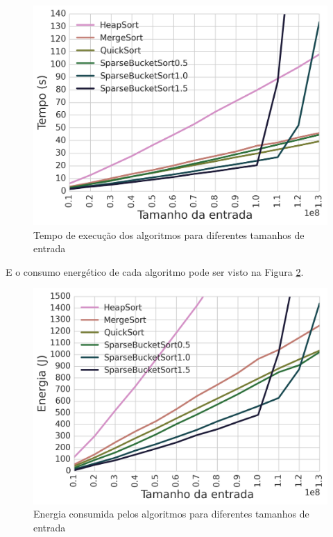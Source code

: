 \begin{figure}[htp]
\centering
\includegraphics[scale=0.70]{figuras/Exper/Algorit/meantime.png}
\caption{Tempo de execução dos algoritmos para diferentes tamanhos de entrada}
\label{fig:algorit_meantime}
\end{figure}%

E o consumo energético de cada algoritmo pode ser visto na Figura \ref{fig:algorit_meanenergy}.


\begin{figure}[htp]
\centering
\includegraphics[scale=0.70]{figuras/Exper/Algorit/meanenergy.png}
\caption{Energia consumida pelos algoritmos para diferentes tamanhos de entrada}
\label{fig:algorit_meanenergy}
\end{figure}\FloatBarrier


